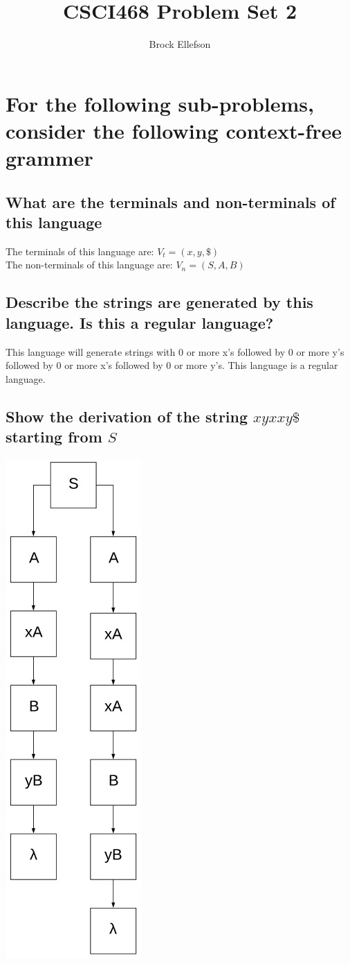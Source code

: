 \documentclass[10pt,a4paper]{article}
\author{Brock Ellefson}
\title{CSCI468 Problem Set 2}
\begin{document}
\maketitle
\section{For the following sub-problems, consider the following context-free grammer}
\subsection{What are the terminals and non-terminals of this language}
The terminals of this language are: $V_{t} = (x , y, \$)$ \\
The non-terminals of this language are: $V_{n} = (S, A, B)$

\subsection{Describe the strings are generated by this language. Is this a regular language?}
This language will generate strings with 0 or more x's followed by 0 or more y's followed by 0 or more x's followed by 0 or more y's. This language is a regular language.

\subsection{Show the derivation of the string $xyxxy\$$ starting from $S$}
\includegraphics[scale=.5]{parsetree.png}
\end{document}
